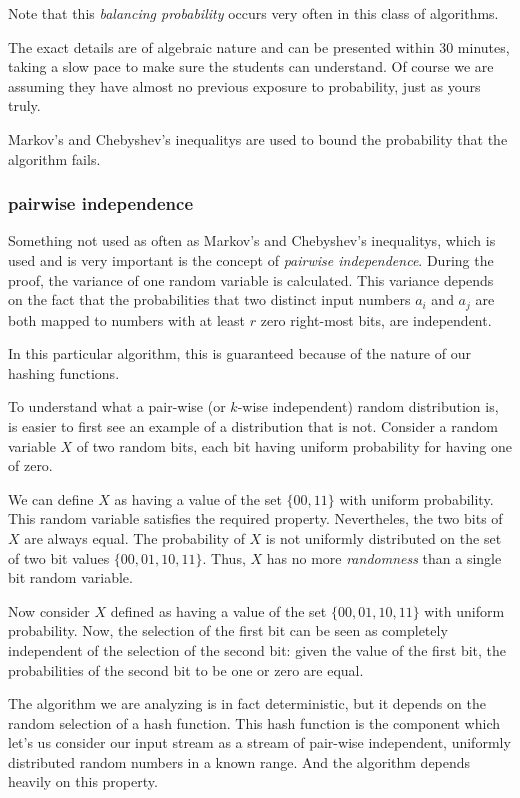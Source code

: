 \documentclass[12pt]{article}
\begin{document}
Note that this \emph{balancing probability} occurs very often in this class of algorithms.

The exact details are of algebraic nature and can be presented within 30 minutes, taking a slow pace to make sure the students can understand. Of course we are assuming they have almost no previous exposure to probability, just as yours truly.

Markov's and Chebyshev's inequalitys are used to bound the probability that the algorithm fails.

\subsubsection{pairwise independence}

Something not used as often as Markov's and Chebyshev's inequalitys, which is used and is very important 
is the concept of \emph{pairwise independence}. During the proof, the variance of one random variable is calculated. 
This variance depends on the fact that the probabilities that two distinct input numbers $a_i$ and $a_j$ are both mapped to numbers with at least $r$ zero right-most bits, are independent.

In this particular algorithm, this is guaranteed because of the nature of our hashing functions.

To understand what a pair-wise (or $k$-wise independent)  random distribution is, is easier to first see an example of a distribution that is not. 
Consider a  random variable $X$ of two random bits, each bit having uniform probability for having one of zero.

We can define $X$ as having a value of the set $\{00,11\}$ with uniform probability. This random variable satisfies the required property. Nevertheles, the two bits of $X$ are always equal. The probability of $X$ is not uniformly distributed on the set of two bit values $\{00,01,10,11\}$.
Thus, $X$ has no more \emph{randomness} than a single bit random variable.

Now consider $X$ defined as having a value of the set $\{00,01,10,11\}$ with uniform probability. Now, the selection of the first bit can be seen as completely independent of the selection of the second bit: given the value of the first bit, the probabilities  of the second bit to be one or zero are equal.

The algorithm we are analyzing is in fact deterministic, but it depends on the random selection of a hash function. This hash function is the component which let's us consider our input stream as a stream of pair-wise independent, uniformly distributed random numbers in a known range. And the algorithm depends heavily on this property.
\end{document}
